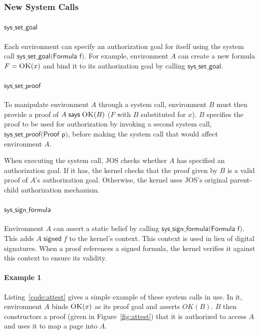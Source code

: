 \documentclass[10pt]{article}
\newcommand{\sign}[2]{\ensuremath{#1\;\textsf{signed}\;#2}}
\newcommand{\says}[2]{\ensuremath{#1\;\textsf{says}\;#2}}
\newcommand{\pred}[2]{\ensuremath{\textsc{#1}(#2)}}
\begin{document}
\subsubsection{New System Calls}
\paragraph{$\textsf{sys\_set\_goal}$} Each environment can specify an authorization goal for itself using the system call $\textsf{sys\_set\_goal(Formula f)}$.
For example, environment $A$ can create a new formula $F = \pred{OK}{x}$ and bind it to its authorization goal by calling $\textsf{sys\_set\_goal}$.

\paragraph{$\textsf{sys\_set\_proof}$} To manipulate environment $A$ through a system call, environment $B$ must then provide a proof of $\says{A}{\pred{OK}{B}}$ ($F$ with $B$ substituted for $x$). $B$ specifies the proof to be used for authorization by invoking a second system call, $\textsf{sys\_set\_proof(Proof p)}$, before making the system call that would affect environment $A$.

When executing the system call, JOS checks whether $A$ has specified an authorization goal. If it has, the kernel checks that the proof given by $B$ is a valid proof of $A$'s authorization goal. Otherwise, the kernel uses JOS's original parent-child authorization mechanism.

\paragraph{$\textsf{sys\_sign\_formula}$} Environment $A$ can assert a static belief by calling $\textsf{sys\_sign\_formula(Formula f)}$. This adds $\sign{A}{f}$ to the kernel's context.
This context is used in lieu of digital signatures. When a proof references a signed formula, the kernel verifies it against this context to ensure its validity.

\paragraph{Example 1} Listing~\ref{code:attest} gives a simple example of these system calls in use. In it, environment $A$ binds $\pred{OK}{x}$ as its proof goal and asserts $OK(B)$. $B$ then constructors a proof (given in Figure~\ref{fig:attest}) that it is authorized to access $A$ and uses it to map a page into $A$.
\end{document}

